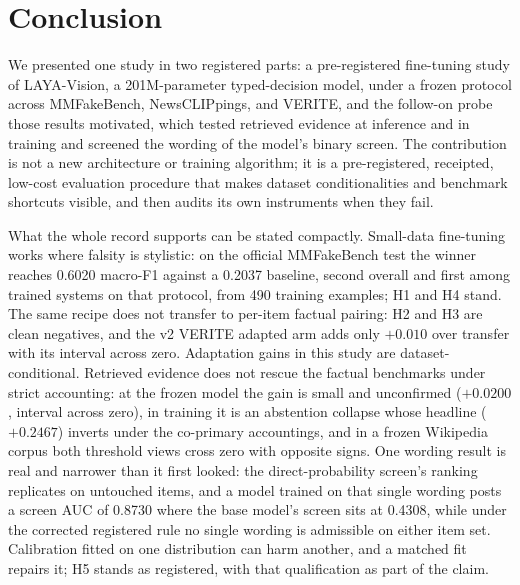 \documentclass{article} %
\begin{document}
\section{Conclusion}
\label{sec:conclusion}
We presented one study in two registered parts: a pre-registered fine-tuning study of LAYA-Vision, a 201M-parameter typed-decision model, under a frozen protocol across MMFakeBench, NewsCLIPpings, and VERITE, and the follow-on probe those results motivated, which tested retrieved evidence at inference and in training and screened the wording of the model's binary screen. The contribution is not a new architecture or training algorithm; it is a pre-registered, receipted, low-cost evaluation procedure that makes dataset conditionalities and benchmark shortcuts visible, and then audits its own instruments when they fail.

What the whole record supports can be stated compactly. Small-data fine-tuning works where falsity is stylistic: on the official MMFakeBench test the winner reaches 0.6020 macro-F1 against a 0.2037 baseline, second overall and first among trained systems on that protocol, from 490 training examples; H1 and H4 stand. The same recipe does not transfer to per-item factual pairing: H2 and H3 are clean negatives, and the v2 VERITE adapted arm adds only \(+0.010\) over transfer with its interval across zero. Adaptation gains in this study are dataset-conditional. Retrieved evidence does not rescue the factual benchmarks under strict accounting: at the frozen model the gain is small and unconfirmed (\(+0.0200\), interval across zero), in training it is an abstention collapse whose headline (\(+0.2467\)) inverts under the co-primary accountings, and in a frozen Wikipedia corpus both threshold views cross zero with opposite signs. One wording result is real and narrower than it first looked: the direct-probability screen's ranking replicates on untouched items, and a model trained on that single wording posts a screen AUC of 0.8730 where the base model's screen sits at 0.4308, while under the corrected registered rule no single wording is admissible on either item set. Calibration fitted on one distribution can harm another, and a matched fit repairs it; H5 stands as registered, with that qualification as part of the claim.
\end{document}
